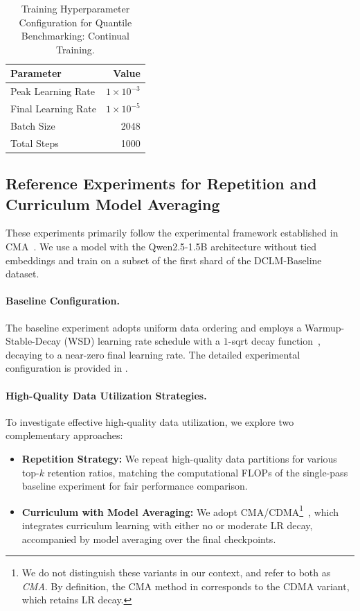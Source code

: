 \begin{table}[htbp]
\centering
\caption{Training Hyperparameter Configuration for Quantile Benchmarking: Continual Training.}
\label{tab:continual_training}
\begin{tabular}{@{}lr@{}}
\toprule 
\textbf{Parameter} & \textbf{Value} \\
\midrule
Peak Learning Rate & $1\times 10^{-3}$ \\
Final Learning Rate & $1\times 10^{-5}$ \\
Batch Size & 2048 \\
Total Steps & 1000 \\
\bottomrule
\end{tabular}
\end{table}

\subsection{Reference Experiments for Repetition and Curriculum Model Averaging}\label{sec:reference_repetition_curriculum}

These experiments primarily follow the experimental framework established in CMA~\citep{luo2025learningratedecaywastes}. We use a model with the Qwen2.5-1.5B architecture without tied embeddings and train on a subset of the first shard of the DCLM-Baseline dataset.

\paragraph{Baseline Configuration.}
The baseline experiment adopts uniform data ordering and employs a Warmup-Stable-Decay (WSD) learning rate schedule with a $1$-sqrt decay function~\citep{hagele,tian2025wsmdecayfreelearningrate}, decaying to a near-zero final learning rate. The detailed experimental configuration is provided in .

\paragraph{High-Quality Data Utilization Strategies.}
To investigate effective high-quality data utilization, we explore two complementary approaches:
\begin{itemize}
    \item[(1)] \textbf{Repetition Strategy:} We repeat high-quality data partitions for various top-$k$ retention ratios, matching the computational FLOPs of the single-pass baseline experiment for fair performance comparison.
    \item[(2)] \textbf{Curriculum with Model Averaging:} We adopt CMA/CDMA\footnote{We do not distinguish these variants in our context, and refer to both as \textit{CMA}. By definition, the CMA method in  corresponds to the CDMA variant, which retains LR decay.}~\citep{luo2025learningratedecaywastes}, which integrates curriculum learning with either no or moderate LR decay, accompanied by model averaging over the final checkpoints.
\end{itemize}

